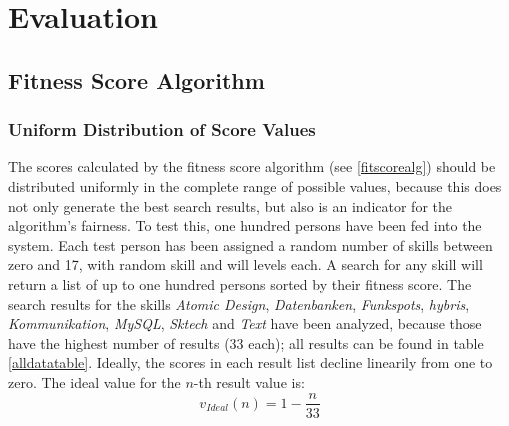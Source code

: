 \chapter{Evaluation}

%
%
%

\section{Fitness Score Algorithm}

\subsection{Uniform Distribution of Score Values}
The scores calculated by the fitness score algorithm (see \ref{fitscorealg}) should be distributed uniformly in the complete range of possible values, because this does not only generate the best search results, but also is an indicator for the algorithm's fairness.
To test this, one hundred persons have been fed into the system. Each test person has been assigned a random number of skills between zero and 17, with random skill and will levels each. A search for any skill will return a list of up to one hundred persons sorted by their fitness score. The search results for the skills \textit{Atomic Design}, \textit{Datenbanken}, \textit{Funkspots}, \textit{hybris}, \textit{Kommunikation}, \textit{MySQL}, \textit{Sktech} and \textit{Text} have been analyzed, because those have the highest number of results (33 each); all results can be found in table \ref{alldatatable}. Ideally, the scores in each result list decline linearily from one to zero. The ideal value for the $n$-th result value is:
\[
	v_{Ideal}(n) = 1 - \frac{n}{33}
\]

